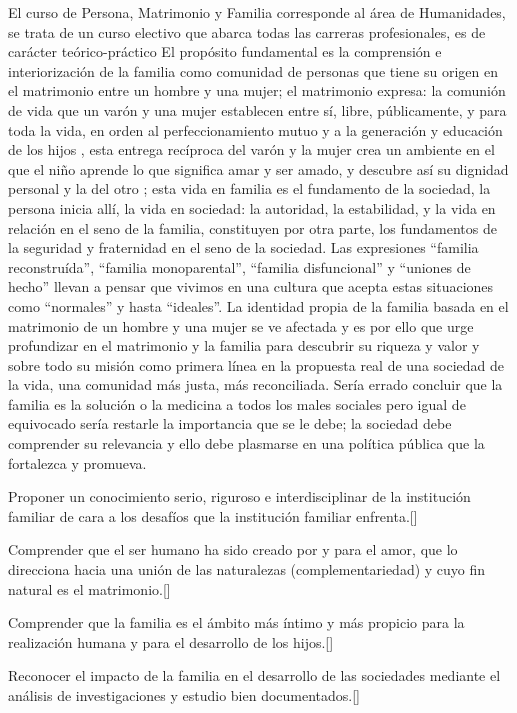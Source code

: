 \begin{syllabus}


\begin{justification}
El curso de Persona, Matrimonio y Familia corresponde al área de Humanidades, se trata de un curso electivo que abarca todas las carreras profesionales, es de carácter teórico-práctico El propósito fundamental es la comprensión e interiorización  de la familia como  comunidad de personas que tiene su origen en el matrimonio entre un hombre y una mujer; el matrimonio expresa: la comunión de vida que un varón y una mujer establecen entre sí­, libre, públicamente, y para toda la vida, en orden al perfeccionamiento mutuo y a la generación y educación de los hijos , esta entrega recíproca del varón y la mujer crea  un ambiente en el que el niño aprende lo que significa amar y ser amado, y descubre así­ su dignidad personal y la del otro ; esta vida en familia es el fundamento de la sociedad, la persona inicia allí, la vida en sociedad: la autoridad, la estabilidad, y la vida en relación en el seno de la familia, constituyen por otra parte, los fundamentos de la seguridad y fraternidad en el seno de la sociedad.
Las expresiones ``familia reconstruída'', ``familia monoparental'', ``familia disfuncional'' y ``uniones de hecho'' llevan a pensar que vivimos en una cultura que acepta estas situaciones como ``normales'' y hasta ``ideales''. La identidad propia de la familia basada en el matrimonio de un hombre y una mujer se ve afectada y es por ello que urge profundizar en el matrimonio y la familia para descubrir su riqueza y valor y sobre todo su misión como primera línea en la propuesta real de una sociedad de la vida, una comunidad más justa, más reconciliada. Sería errado concluir que la familia es la solución o la medicina a todos los males sociales pero igual de equivocado sería restarle la importancia que se le debe; la sociedad debe comprender su relevancia y ello debe plasmarse en una política pública que la fortalezca y promueva. 
\end{justification}

\begin{goals}
	\item Proponer un conocimiento serio, riguroso e interdisciplinar de la institución familiar de cara a los desafíos que la institución familiar enfrenta.[\Usage]
	\item Comprender que el ser humano ha sido creado por y para el amor, que lo direcciona hacia una unión de las naturalezas (complementariedad) y cuyo fin natural es el matrimonio.[\Familiarity]
	\item Comprender que la familia es el ámbito más íntimo y más propicio para la realización humana y para el desarrollo de los hijos.[\Familiarity]
	\item Reconocer el impacto de la familia en el desarrollo de las sociedades mediante el análisis de investigaciones y estudio bien documentados.[\Familiarity]
\end{goals}


\end{syllabus}
